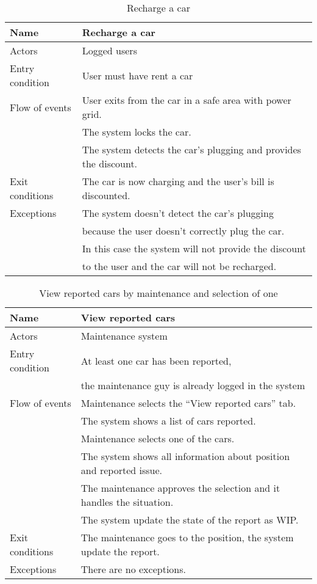 \documentclass[10pt, a4paper,titlepage]{article}
\begin{document}
\begin{table}[h]
\caption{Recharge a car} \label{tab:scenario10}
\begin{tabular}{|l|l|}
\hline
Name & Recharge a car\\
\hline
Actors & Logged users\\ 
\hline
Entry condition & User must have rent a car\\
\hline
Flow of events & User exits from the car in a safe area with power grid.\\
& The system locks the car.\\
& The system detects the car's plugging and provides the discount.\\
\hline
Exit conditions & The car is now charging and the user's bill is discounted.\\
\hline
Exceptions & The system doesn’t detect the car’s plugging \\
& because the user doesn’t correctly plug the car. \\
& In this case the system will not provide the discount \\
& to the user and the car will not be recharged.\\
\hline
\end{tabular}
\end{table}
\begin{table}[h]
\caption{View reported cars by maintenance and selection of one} \label{tab:scenario11}
\begin{tabular}{|l|l|}
\hline
Name & View reported cars\\
\hline
Actors & Maintenance system\\ 
\hline
Entry condition & At least one car has been reported, \\
& the maintenance guy is already logged in the system\\
\hline
Flow of events & Maintenance selects the “View reported cars” tab.\\
& The system shows a list of cars reported.\\
& Maintenance selects one of the cars.\\
& The system shows all information about position and reported issue.\\
& The maintenance approves the selection and it handles the situation.\\
& The system update the state of the report as WIP.\\
\hline
Exit conditions & The maintenance goes to the position, the system update the report.\\
\hline
Exceptions & There are no exceptions.\\
\hline
\end{tabular}
\end{table}
\end{document}
